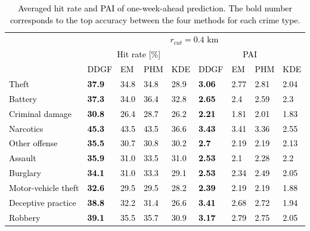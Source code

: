 \documentclass[review]{elsarticle}
\newcommand{\red}[1]{\textcolor{black}{#1}}
\begin{document}
\begin{table}
\red{
 \caption{ Averaged hit rate and PAI of one-week-ahead prediction.
 The bold number corresponds to the top accuracy between the four methods for each crime type.}
\begin{center}
\begin{tabular}{@{}p{9em}p{3em}p{3em}p{3em}p{3em}p{3em}p{3em}p{3em}p{3em}@{}}
\toprule[1.0pt]
 & \multicolumn{8}{c}{$r_{cut} = 0.4$ km} \\
 & \multicolumn{4}{c}{Hit rate [\%]} & \multicolumn{4}{c}{PAI} \\ \cmidrule(r){2-5}\cmidrule(r){6-9}
 & DDGF & EM & PHM & \red{KDE} & DDGF & EM & PHM & \red{KDE} \\ \midrule
Theft                &\bf 37.9 & 34.8 & 34.8 & 28.9                 &\bf 3.06 & 2.77 & 2.81 & 2.04 \\
Battery              &\bf 37.3 & 34.0 & 36.4 & 32.8                 &\bf 2.65 & 2.4 & 2.59 & 2.3 \\
Criminal damage      &\bf 30.8 & 26.4 & 28.7 & 26.2                 &\bf 2.21 & 1.81 & 2.01 & 1.83 \\
Narcotics            &\bf 45.3 & 43.5 & 43.5 & 36.6                 &\bf 3.43 & 3.41 & 3.36 & 2.55 \\
Other offense        &\bf 35.5 & 30.7 & 30.8 & 30.2                 &\bf 2.7 & 2.19 & 2.19 & 2.13 \\
Assault              &\bf 35.9 & 31.0 & 33.5 & 31.0                 &\bf 2.53 & 2.1 & 2.28 & 2.2 \\
Burglary             &\bf 34.1 & 31.0 & 33.3 & 29.1                 &\bf 2.53 & 2.34 & 2.49 & 2.05 \\
Motor-vehicle theft  &\bf 32.6 & 29.5 & 29.5 & 28.2                 &\bf 2.39 & 2.19 & 2.19 & 1.88 \\
Deceptive practice   &\bf 38.8 & 32.2 & 31.4 & 26.6                 &\bf 3.41 & 2.68 & 2.72 & 1.94 \\
Robbery              &\bf 39.1 & 35.5 & 35.7 & 30.9                 &\bf 3.17 & 2.79 & 2.75 & 2.05 \\
\bottomrule[1.25pt]
\end{tabular}
\end{center}
\label{table2}
} %
\end{table}
\end{document}
